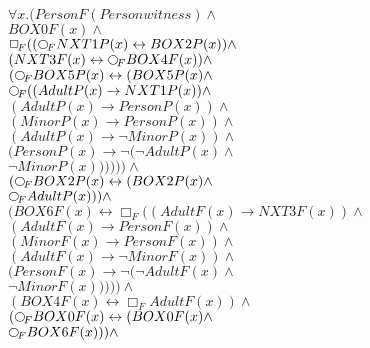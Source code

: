 \documentclass[a4paper,10pt]{article}
\begin{document}
 \newcommand{\nxt}{{\ensuremath\raisebox{0.25ex}{\text{\scriptsize$\bigcirc$}}}}
\newcommand{\Rdiamond}{\Diamond_{\!F}}
\newcommand{\Rbox}{\Box_{\!F}}
\newcommand{\Rnext}{\nxt_{\!F}}
\newcommand{\Ldiamond}{\Diamond_{\!P}}
\newcommand{\Lbox}{\Box_{\!P}}
\newcommand{\Lnext}{\nxt_{\!P}}
\newcommand{\SVdiamond}{\mathop{\ooalign{$\Diamond$ \cr \kern0.5ex
    \raisebox{0.35ex}{\scalebox{0.7}{$*$}}} \kern-0.9ex}}
\newcommand{\SVbox}{\mathop{\ooalign{$\Box$ \cr \kern0.42ex
    \raisebox{0.3ex}{\scalebox{0.7}{$*$}}} \kern-0.9ex}}


$ \forall x. (PersonF(Personwitness) \land $ \\ 
 $ BOX0F(x) \land $ \\ 
 $  \Rbox (( \Rnext NXT1P(x) \leftrightarrow BOX2P(x)) \land $ \\ 
 $ (NXT3F(x) \leftrightarrow  \Rnext BOX4F(x)) \land $ \\ 
 $ ( \Rnext BOX5P(x) \leftrightarrow (BOX5P(x) \land $ \\ 
 $  \Rnext ((AdultP(x) \rightarrow NXT1P(x)) \land $ \\ 
 $ (AdultP(x) \rightarrow PersonP(x)) \land $ \\ 
 $ (MinorP(x) \rightarrow PersonP(x)) \land $ \\ 
 $ (AdultP(x) \rightarrow  \lnot MinorP(x)) \land $ \\ 
 $ (PersonP(x) \rightarrow  \lnot ( \lnot AdultP(x) \land $ \\ 
 $  \lnot MinorP(x)))))) \land $ \\ 
 $ ( \Rnext BOX2P(x) \leftrightarrow (BOX2P(x) \land $ \\ 
 $  \Rnext AdultP(x))) \land $ \\ 
 $ (BOX6F(x) \leftrightarrow  \Rbox ((AdultF(x) \rightarrow NXT3F(x)) \land $ \\ 
 $ (AdultF(x) \rightarrow PersonF(x)) \land $ \\ 
 $ (MinorF(x) \rightarrow PersonF(x)) \land $ \\ 
 $ (AdultF(x) \rightarrow  \lnot MinorF(x)) \land $ \\ 
 $ (PersonF(x) \rightarrow  \lnot ( \lnot AdultF(x) \land $ \\ 
 $  \lnot MinorF(x))))) \land $ \\ 
 $ (BOX4F(x) \leftrightarrow  \Rbox AdultF(x)) \land $ \\ 
 $ ( \Rnext BOX0F(x) \leftrightarrow (BOX0F(x) \land $ \\ 
 $  \Rnext BOX6F(x))) \land $ \\ 
\end{document}
